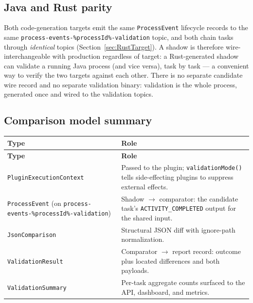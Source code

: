 \subsection{Java and Rust parity}

Both code-generation targets emit the same \texttt{ProcessEvent} lifecycle records to the
same \texttt{process-events-\%processId\%-validation} topic, and both chain tasks through \emph{identical}
topics (Section~\ref{sec:RustTarget}). A shadow is therefore
wire-interchangeable with production regardless of target: a Rust-generated shadow can
validate a running Java process (and vice versa), task by task --- a convenient way to
verify the two targets against each other. There is no separate candidate wire record and
no separate validation binary: validation is the whole process, generated once and wired
to the validation topics.

\subsection{Comparison model summary}

\begin{longtable}{|>{\raggedright\arraybackslash}p{}|>{\raggedright\arraybackslash}p{}|}
\hline
\rowcolor[gray]{0.9}\textbf{Type} & \textbf{Role} \\
\hline
\endfirsthead
\hline
\rowcolor[gray]{0.9}\textbf{Type} & \textbf{Role} \\
\hline
\endhead
\texttt{PluginExecutionContext} & Passed to the plugin; \texttt{validationMode()} tells side-effecting plugins to suppress external effects. \\
\texttt{ProcessEvent} (on \texttt{process-events-\%processId\%-validation}) & Shadow $\rightarrow$ comparator: the candidate task's \texttt{ACTIVITY\_COMPLETED} output for the shared input. \\
\texttt{JsonComparison} & Structural JSON diff with ignore-path normalization. \\
\texttt{ValidationResult} & Comparator $\rightarrow$ report record: outcome plus located differences and both payloads. \\
\texttt{ValidationSummary} & Per-task aggregate counts surfaced to the API, dashboard, and metrics. \\
\end{longtable}
